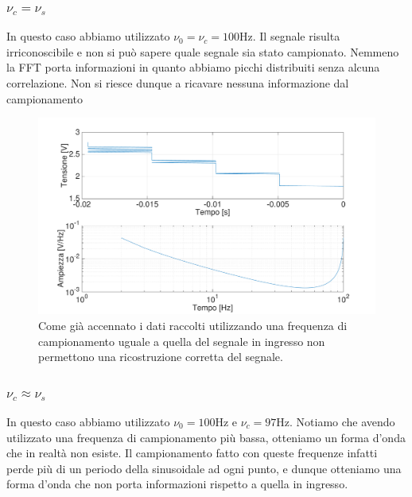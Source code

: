 \subsubsection{ $\nu_c = \nu_s$}

In questo caso abbiamo utilizzato $\nu_0=\nu_c=100 \si{\hertz}$. Il segnale risulta irriconoscibile e non si può sapere quale segnale sia stato campionato. Nemmeno la FFT porta informazioni in quanto abbiamo picchi distribuiti senza alcuna correlazione. Non si riesce dunque a ricavare nessuna informazione dal campionamento

\begin{figure}[H]
\centering
	\includegraphics[width=.73\textwidth]{../E13/latex/sin100hz@100,100_2.pdf}
	\caption{Come già accennato i dati raccolti utilizzando una frequenza di campionamento uguale a quella del segnale in ingresso non permettono una ricostruzione corretta del segnale. }
	\label{sin2}
\end{figure}

\subsubsection{ $\nu_c \approx \nu_s$}
In questo caso abbiamo utilizzato $\nu_0=100 \si{\hertz}$ e $\nu_c=97 \si{\hertz}$. Notiamo che avendo utilizzato una frequenza di campionamento più bassa, otteniamo un forma d'onda che in realtà non esiste. Il campionamento fatto con queste frequenze infatti perde più di un periodo della sinusoidale ad ogni punto, e dunque otteniamo una forma d'onda che non porta informazioni rispetto a quella in ingresso.


